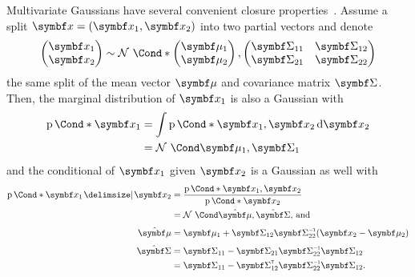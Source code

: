 Multivariate Gaussians have several convenient closure properties~\parencite{astrom_introduction_1971}.
Assume a split $\mat{x} = (\mat{x}_1, \mat{x}_2)$ into two partial vectors and denote
\begin{equation}
    \begin{split}
        \begin{pmatrix}
            \mat{x}_1 \\
            \mat{x}_2
        \end{pmatrix}
        \sim \Gaussian*{
            \begin{pmatrix}
                \mat{\mu}_1 \\
                \mat{\mu}_2
            \end{pmatrix},
            \begin{pmatrix}
                \mat{\Sigma}_{11} & \mat{\Sigma}_{12} \\
                \mat{\Sigma}_{21} & \mat{\Sigma}_{22}
            \end{pmatrix}
        }
    \end{split}
\end{equation}
the same split of the mean vector $\mat{\mu}$ and covariance matrix $\mat{\Sigma}$.
Then, the marginal distribution of $\mat{x}_1$ is also a Gaussian with
\begin{equation}
    \begin{split}
        \label{eq:gaussian_marginal}
        \Prob*{\mat{x}_1}
        &= \int \Prob*{\mat{x}_1, \mat{x}_2} \diff \mat{x}_2 \\
        &= \Gaussian{\mat{\mu}_1, \mat{\Sigma}_1}
    \end{split}
\end{equation}
and the conditional of $\mat{x}_1$ given $\mat{x}_2$ is a Gaussian as well with
\begin{equation}
    \begin{split}
        \label{eq:gaussian_conditional}
        \Prob*{\mat{x}_1 \given \mat{x}_2}
        &= \frac{\Prob*{\mat{x}_1, \mat{x}_2}}{\Prob*{\mat{x}_2}} \\
        &= \Gaussian{\hat{\mat{\mu}}, \hat{\mat{\Sigma}}}\text{, and} \\[\smallskipamount]
        \hat{\mat{\mu}}
        &= \mat{\mu}_1 + \mat{\Sigma}_{12}\mat{\Sigma}\inv_{22} (\mat{x}_2 - \mat{\mu}_2) \\[\smallskipamount]
        \hat{\mat{\Sigma}}
        &= \mat{\Sigma}_{11} - \mat{\Sigma}_{21} \mat{\Sigma}\inv_{22} \mat{\Sigma}_{12} \\
        &= \mat{\Sigma}_{11} - \mat{\Sigma}\tran_{12} \mat{\Sigma}\inv_{22} \mat{\Sigma}_{12}.
    \end{split}
\end{equation}

